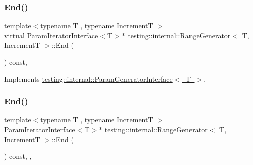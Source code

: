 \mbox{\label{classtesting_1_1internal_1_1_range_generator_a8d2acbb733791a14df6e7bd3754e9003}} 
\subsubsection{\texorpdfstring{End()}{End()}\hspace{0.1cm}{\footnotesize\ttfamily [1/3]}}
{\footnotesize\ttfamily template$<$typename T , typename IncrementT $>$ \\
virtual \mbox{\hyperlink{classtesting_1_1internal_1_1_param_iterator_interface}{Param\+Iterator\+Interface}}$<$T$>$$\ast$ \mbox{\hyperlink{classtesting_1_1internal_1_1_range_generator}{testing\+::internal\+::\+Range\+Generator}}$<$ T, IncrementT $>$\+::End (\begin{DoxyParamCaption}{ }\end{DoxyParamCaption}) const\hspace{0.3cm}{\ttfamily [inline]}, {\ttfamily [virtual]}}



Implements \mbox{\hyperlink{classtesting_1_1internal_1_1_param_generator_interface_afa7211b74990e11d3fc7ad4e7113da4f}{testing\+::internal\+::\+Param\+Generator\+Interface$<$ T $>$}}.

\mbox{\label{classtesting_1_1internal_1_1_range_generator_ac112ca69567b9c47bf14554e0473e1e2}} 
\subsubsection{\texorpdfstring{End()}{End()}\hspace{0.1cm}{\footnotesize\ttfamily [2/3]}}
{\footnotesize\ttfamily template$<$typename T , typename IncrementT $>$ \\
\mbox{\hyperlink{classtesting_1_1internal_1_1_param_iterator_interface}{Param\+Iterator\+Interface}}$<$T$>$$\ast$ \mbox{\hyperlink{classtesting_1_1internal_1_1_range_generator}{testing\+::internal\+::\+Range\+Generator}}$<$ T, IncrementT $>$\+::End (\begin{DoxyParamCaption}{ }\end{DoxyParamCaption}) const\hspace{0.3cm}{\ttfamily [inline]}, {\ttfamily [override]}, {\ttfamily [virtual]}}




